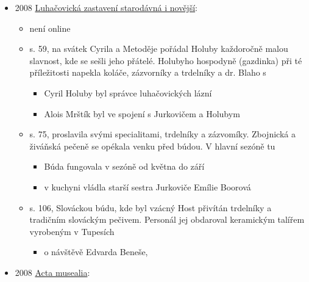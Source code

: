 \begin{itemize}
  \begin{itemize}
  \tightlist
  \item
    není online, 
  \item
    s. 45: náhled, milosti, snad i perník a trdelníky. Z jarmarku nebo
  \end{itemize}
\item
  2008
  \href{https://ceskadigitalniknihovna.cz/uuid/uuid:b2d480f0-9aeb-11e3-8e84-005056827e51}{Luhačovická
  zastavení starodávná i novější}:

  \begin{itemize}
  \tightlist
  \item
    není online
  \item
    s. 59, na svátek Cyrila a Metoděje pořádal Holuby každoročně malou
    slavnost, kde se sešli jeho přátelé. Holubyho hospodyně (gazdinka)
    při té příležitosti napekla koláče, zázvorníky a trdelníky a dr.
    Blaho s

    \begin{itemize}
    \tightlist
    \item
      Cyril Holuby byl správce luhačovických lázní
    \item
      Alois Mrštík byl ve spojení s Jurkovičem a Holubym
    \end{itemize}
  \item
    s. 75, proslavila svými specialitami, trdelníky a zázvomíky.
    Zbojnická a živáňská pečeně se opékala venku před búdou. V hlavní
    sezóně tu

    \begin{itemize}
    \tightlist
    \item
      Búda fungovala v sezóně od května do září
    \item
      v kuchyni vládla starší sestra Jurkoviče Emílie Boorová
    \end{itemize}
  \item
    s. 106, Slováckou búdu, kde byl vzácný Host přivítán trdelníky a
    tradičním slováckým pečivem. Personál jej obdaroval keramickým
    talířem vyrobeným v Tupesích

    \begin{itemize}
    \tightlist
    \item
      o návštěvě Edvarda Beneše,
    \end{itemize}
  \end{itemize}
\item
  2008
  \href{https://ceskadigitalniknihovna.cz/uuid/uuid:06cd95f1-915c-4408-8ab5-5e8abdacd4ea}{Acta
  musealia}:


\end{itemize}
